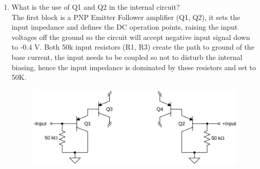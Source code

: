 \documentclass[journal,12pt,twocolumn]{IEEEtran}
\renewcommand\thesection{\arabic{section}}
\begin{document}
\begin{enumerate}[label=\thesection.\arabic*,ref=\thesection.\theenumi]
\item What is the use of Q1 and Q2 in the internal circuit?\\
\solution
The first block is a PNP Emitter Follower amplifier (Q1, Q2), it sets the input impedance and defines the DC operation points, raising the input voltages off the ground so the circuit will accept negative input signal down to -0.4 V. Both 50k input resistors (R1, R3) create the path to ground of the base current, the input needs to be coupled so not to disturb the internal biasing, hence the input impedance is dominated by these resistors and set to 50K.
\begin{figure}[!ht]
\centering
\includegraphics[width=\columnwidth]{./Fig/lm3861.eps}
\caption{}
\label{fig:1}
\end{figure}
\end{enumerate}
\end{document}
